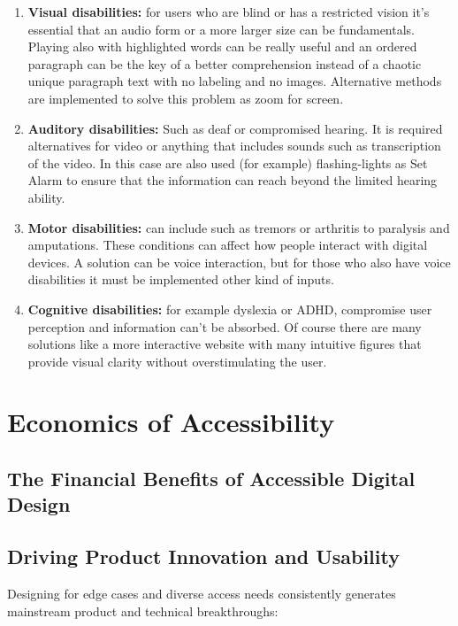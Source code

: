 \documentclass[11pt,a4paper]{article}
\begin{document}
	 \begin{enumerate}
 		\item \textbf{Visual disabilities:} for users who are blind or has a restricted vision it’s essential that an audio form or a more larger size 
		can be fundamentals. Playing also with highlighted words can be really useful and an ordered paragraph can be the key of a 
		better comprehension instead of a chaotic unique paragraph text with no labeling and no images. Alternative methods are 
		implemented to solve this problem as zoom for screen.
		 \item \textbf{Auditory disabilities:} Such as deaf or compromised hearing. It is required alternatives for video or anything that 
		 includes sounds such as transcription of the video. In this case are also used (for example) flashing-lights as Set Alarm to ensure that the 
		 information can reach beyond the limited hearing ability.
		 \item \textbf{Motor disabilities:} can include such as tremors or arthritis to paralysis and amputations. These conditions can affect how
		  people interact with digital devices. A solution can be voice interaction, but for those who also have voice disabilities it 
		  must be implemented other kind of inputs.
		  \item  \textbf{Cognitive disabilities:} for example dyslexia or ADHD, compromise user perception and information can’t be 
		  absorbed. Of course there are many solutions like a more interactive website with many intuitive figures that provide 
		  visual clarity without overstimulating the user.
	\end{enumerate}
	
\newpage
	

\section{Economics of Accessibility}


	\subsection{\Large The Financial Benefits of Accessible Digital Design}

	\subsection{Driving Product Innovation and Usability}
	Designing for edge cases and diverse access needs consistently generates
	mainstream product and technical breakthroughs:
	
\end{document}
